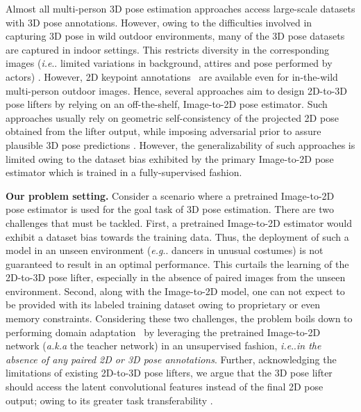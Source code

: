 \documentclass[runningheads]{llncs}
\makeatletter
\DeclareRobustCommand\onedot{\futurelet\@let@token\@onedot}
\def\@onedot{\ifx\@let@token.\else.\null\fi\xspace}
\def\eg{\emph{e.g}\onedot} \def\Eg{\emph{E.g}\onedot}
\def\ie{\emph{i.e}\onedot} \def\Ie{\emph{I.e}\onedot}
\makeatother
\begin{document}
Almost all multi-person 3D pose estimation approaches access large-scale datasets with 3D pose annotations. However, owing to the difficulties involved in capturing 3D pose in wild outdoor environments, many of the 3D pose datasets are captured in indoor settings. This restricts diversity in the corresponding images (\ie limited variations in background, attires and pose performed by actors) \cite{ionescu2013human3,joo2015panoptic}. However, 2D keypoint annotations~\cite{nath2018object,kundu2018ispa} are available even for in-the-wild multi-person outdoor images. Hence, several approaches aim to design 2D-to-3D pose lifters \cite{chen2019unsupervised_cvpr,martinez2017simple} by relying on an off-the-shelf, Image-to-2D pose estimator. Such approaches usually rely on geometric self-consistency of the projected 2D pose obtained from the lifter output, while imposing adversarial prior to assure plausible 3D pose predictions \cite{chen2019unsupervised_cvpr,kanazawa2018end}. 
However, the generalizability of such approaches is limited owing to the dataset bias exhibited by the primary Image-to-2D pose estimator which is trained in a fully-supervised fashion.


\textbf{Our problem setting.} 
Consider a scenario where a pretrained Image-to-2D pose estimator is used for the goal task of 3D pose estimation. There are two challenges that must be tackled. First, a pretrained Image-to-2D estimator would exhibit a dataset bias towards the training data. Thus, the deployment of such a model in an unseen environment (\eg dancers in unusual costumes) is not guaranteed to result in an optimal performance. This curtails the learning of the 2D-to-3D pose lifter, especially in the absence of paired images from the unseen environment. Second, along with the Image-to-2D model, one can not expect to be provided with its labeled training dataset owing to proprietary \cite{nayak2019zero,dfkd} or even memory \cite{lwm,lwf} constraints. Considering these two challenges, the problem boils down to performing domain adaptation~\cite{kundu2019adapt} by leveraging the pretrained Image-to-2D network (\textit{a.k.a} the teacher network) in an unsupervised fashion, \ie \textit{in the absence of any paired 2D or 3D pose annotations}. Further, acknowledging the limitations of existing 2D-to-3D pose lifters, we argue that the 3D pose lifter should access the latent convolutional features instead of the final 2D pose output; owing to its greater task transferability \cite{long2015learning}.
\end{document}
